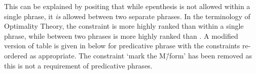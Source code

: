 \begin{multicols}{2}
	\begin{exe}
		\label{ex:muqit-amnasiq}
		\label{ex:muqi-mnasiq}
	\end{exe}
\end{multicols}
\begin{multicols}{2}
	\begin{exe}
		\label{tr:muqit-amnasiq}
		\label{tr:muqi-mnasiq}
	\end{exe}
\end{multicols}

This can be explained by positing that while epenthesis
is not allowed within a single phrase,
it \emph{is} allowed between two separate phrases.
In the terminology of Optimality Theory,
the constraint  is more highly ranked than  within a single phrase,
while between two phrases  is more highly ranked than .
A modified version of table 
is given in  below for predicative phrase
with the constraints re-ordered as appropriate.
The constraint \tsc{\M} `mark the M\=/form' has been removed as
this is not a requirement of predicative phrases.

